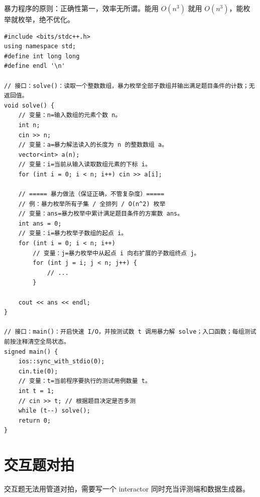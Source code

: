 \documentclass[UTF8,openany,oneside,zihao=-4]{ctexbook}
\begin{document}
\begin{note}
暴力程序的原则：正确性第一，效率无所谓。能用 $O(n^3)$ 就用 $O(n^3)$，能枚举就枚举，绝不优化。
\end{note}

\begin{lstlisting}
#include <bits/stdc++.h>
using namespace std;
#define int long long
#define endl '\n'

// 接口：solve()：读取一个整数数组，暴力枚举全部子数组并输出满足题目条件的计数；无返回值。
void solve() {
    // 变量：n=输入数组的元素个数 n。
    int n;
    cin >> n;
    // 变量：a=暴力解法读入的长度为 n 的整数数组 a。
    vector<int> a(n);
    // 变量：i=当前从输入读取数组元素的下标 i。
    for (int i = 0; i < n; i++) cin >> a[i];

    // ===== 暴力做法（保证正确，不管复杂度）=====
    // 例：暴力枚举所有子集 / 全排列 / O(n^2) 枚举
    // 变量：ans=暴力枚举中累计满足题目条件的方案数 ans。
    int ans = 0;
    // 变量：i=暴力枚举子数组的起点 i。
    for (int i = 0; i < n; i++)
        // 变量：j=暴力枚举中从起点 i 向右扩展的子数组终点 j。
        for (int j = i; j < n; j++) {
            // ...
        }

    cout << ans << endl;
}

// 接口：main()：开启快速 I/O，并按测试数 t 调用暴力解 solve；入口函数；每组测试前按注释清空全局状态。
signed main() {
    ios::sync_with_stdio(0);
    cin.tie(0);
    // 变量：t=当前程序要执行的测试用例数量 t。
    int t = 1;
    // cin >> t; // 根据题目决定是否多测
    while (t--) solve();
    return 0;
}
\end{lstlisting}

\section{交互题对拍}

\begin{note}
交互题无法用管道对拍，需要写一个 interactor 同时充当评测端和数据生成器。
\end{note}
\end{document}
